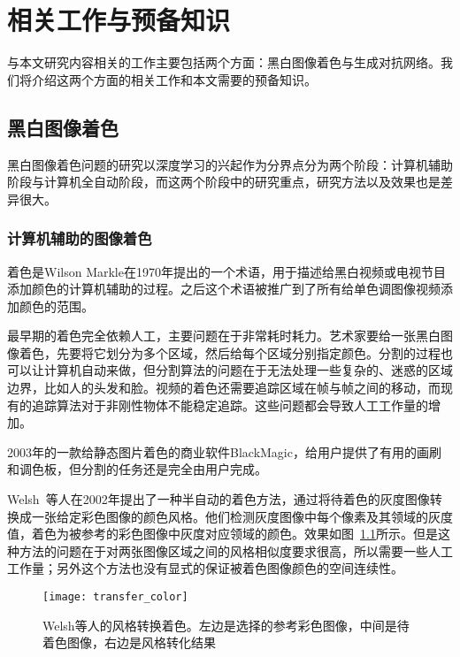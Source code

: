 \chapter{相关工作与预备知识}
\label{cha:2-related}

  与本文研究内容相关的工作主要包括两个方面：黑白图像着色与生成对抗网络。我们将介绍这两个方面的相关工作和本文需要的预备知识。

\section{黑白图像着色}
\label{sec:2-image-color}

  黑白图像着色问题的研究以深度学习的兴起作为分界点分为两个阶段：计算机辅助阶段与计算机全自动阶段，而这两个阶段中的研究重点，研究方法以及效果也是差异很大。

\subsection{计算机辅助的图像着色}
\label{sec:2-user-guided-color}
  
  着色是Wilson Markle在1970年提出的一个术语，用于描述给黑白视频或电视节目添加颜色的计算机辅助的过程。之后这个术语被推广到了所有给单色调图像视频添加颜色的范围。

  最早期的着色完全依赖人工，主要问题在于非常耗时耗力。艺术家要给一张黑白图像着色，先要将它划分为多个区域，然后给每个区域分别指定颜色。分割的过程也可以让计算机自动来做，但分割算法的问题在于无法处理一些复杂的、迷惑的区域边界，比如人的头发和脸。视频的着色还需要追踪区域在帧与帧之间的移动，而现有的追踪算法对于非刚性物体不能稳定追踪。这些问题都会导致人工工作量的增加。

  2003年的一款给静态图片着色的商业软件BlackMagic，给用户提供了有用的画刷和调色板，但分割的任务还是完全由用户完成。

  Welsh~\cite{DBLP:journals/tog/WelshAM02}等人在2002年提出了一种半自动的着色方法，通过将待着色的灰度图像转换成一张给定彩色图像的颜色风格。他们检测灰度图像中每个像素及其领域的灰度值，着色为被参考的彩色图像中灰度对应领域的颜色。效果如图~\ref{fig:transfer}所示。但是这种方法的问题在于对两张图像区域之间的风格相似度要求很高，所以需要一些人工工作量；另外这个方法也没有显式的保证被着色图像颜色的空间连续性。

  \begin{figure}[H]
    \centering
    \texttt{[image: transfer\_color]}
    \caption[Welsh等人的风格转换着色]{Welsh等人的风格转换着色。左边是选择的参考彩色图像，中间是待着色图像，右边是风格转化结果}
    \label{fig:transfer}
  \end{figure}

